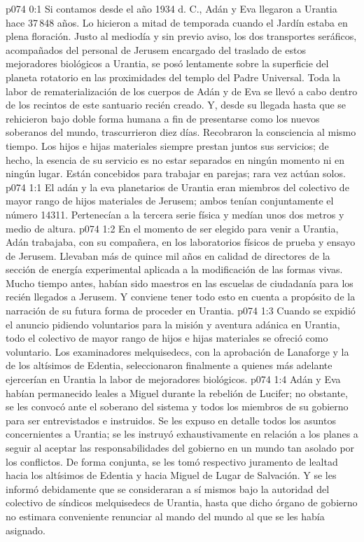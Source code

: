 \author{Solonia}
\vs p074 0:1 Si contamos desde el año 1934 d. C., Adán y Eva llegaron a Urantia hace 37\,848 años. Lo hicieron a mitad de temporada cuando el Jardín estaba en plena floración. Justo al mediodía y sin previo aviso, los dos transportes seráficos, acompañados del personal de Jerusem encargado del traslado de estos mejoradores biológicos a Urantia, se posó lentamente sobre la superficie del planeta rotatorio en las proximidades del templo del Padre Universal. Toda la labor de rematerialización de los cuerpos de Adán y de Eva se llevó a cabo dentro de los recintos de este santuario recién creado. Y, desde su llegada hasta que se rehicieron bajo doble forma humana a fin de presentarse como los nuevos soberanos del mundo, trascurrieron diez días. Recobraron la consciencia al mismo tiempo. Los hijos e hijas materiales siempre prestan juntos sus servicios; de hecho, la esencia de su servicio es no estar separados en ningún momento ni en ningún lugar. Están concebidos para trabajar en parejas; rara vez actúan solos.
\vs p074 1:1 El adán y la eva planetarios de Urantia eran miembros del colectivo de mayor rango de hijos materiales de Jerusem; ambos tenían conjuntamente el número 14311. Pertenecían a la tercera serie física y medían unos dos metros y medio de altura.
\vs p074 1:2 En el momento de ser elegido para venir a Urantia, Adán trabajaba, con su compañera, en los laboratorios físicos de prueba y ensayo de Jerusem. Llevaban más de quince mil años en calidad de directores de la sección de energía experimental aplicada a la modificación de las formas vivas. Mucho tiempo antes, habían sido maestros en las escuelas de ciudadanía para los recién llegados a Jerusem. Y conviene tener todo esto en cuenta a propósito de la narración de su futura forma de proceder en Urantia.
\vs p074 1:3 Cuando se expidió el anuncio pidiendo voluntarios para la misión y aventura adánica en Urantia, todo el colectivo de mayor rango de hijos e hijas materiales se ofreció como voluntario. Los examinadores melquisedecs, con la aprobación de Lanaforge y la de los altísimos de Edentia, seleccionaron finalmente a quienes más adelante ejercerían en Urantia la labor de mejoradores biológicos.
\vs p074 1:4 Adán y Eva habían permanecido leales a Miguel durante la rebelión de Lucifer; no obstante, se les convocó ante el soberano del sistema y todos los miembros de su gobierno para ser entrevistados e instruidos. Se les expuso en detalle todos los asuntos concernientes a Urantia; se les instruyó exhaustivamente en relación a los planes a seguir al aceptar las responsabilidades del gobierno en un mundo tan asolado por los conflictos. De forma conjunta, se les tomó respectivo juramento de lealtad hacia los altísimos de Edentia y hacia Miguel de Lugar de Salvación. Y se les informó debidamente que se consideraran a sí mismos bajo la autoridad del colectivo de síndicos melquisedecs de Urantia, hasta que dicho órgano de gobierno no estimara conveniente renunciar al mando del mundo al que se les había asignado.
